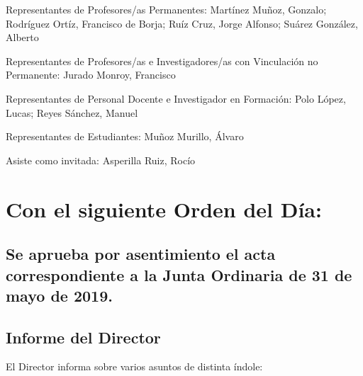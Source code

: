 \documentclass[numerado]{plantillasEPS} %
\begin{document}
\begin{asisten}
    \item[Representantes de Profesores/as Permanentes:] 
    Martínez Muñoz, Gonzalo; Rodríguez Ortíz, Francisco de Borja; Ruíz Cruz, Jorge Alfonso; Suárez González, Alberto
    \item[Representantes de Profesores/as e Investigadores/as con Vinculación no  Permanente:] Jurado Monroy, Francisco
    \item[Representantes de Personal Docente e Investigador en Formación:] Polo López, Lucas; Reyes Sánchez, Manuel
    \item[Representantes de Estudiantes:] Muñoz Murillo, Álvaro
    \item[Asiste como invitada:] Asperilla Ruiz, Rocío
\end{asisten}

\newpage

\chapter{Con el siguiente Orden del Día:}

\section{Se aprueba por asentimiento el acta correspondiente a la Junta Ordinaria de 31 de mayo de 2019.} 
\section{Informe del Director}
El Director informa sobre varios asuntos de distinta índole:
\end{document}
